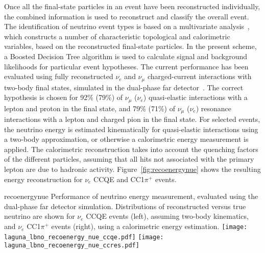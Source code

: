 Once all the final-state particles in an event have been reconstructed individually, 
the combined information is used to reconstruct and classify the overall event.
The identification of neutrino event types is based on a 
multivariate analysis~\cite{Back:2013cva,WA105_TDR,LAGUNA-LBNO-deliv,LAGUNA-LBNO-EOI},
which constructs a number of characteristic topological and calorimetric variables,
based on the reconstructed final-state particles. In the present scheme,
a Boosted Decision Tree algorithm is used to calculate signal and background likelihoods 
for particular event hypotheses. The current performance has been evaluated using fully reconstructed
$\nu_{e}$ and $\nu_{\mu}$ charged-current interactions with two-body final states,
simulated in the dual-phase far detector~\cite{LAGUNA-LBNO-deliv}. 
The correct hypothesis is chosen for 92\% (79\%) of $\nu_{\mu}$ ($\nu_{e}$) quasi-elastic interactions 
with a lepton and proton in the final state, and 79\% (71\%) of $\nu_{\mu}$ ($\nu_{e}$) 
resonance interactions with a lepton and charged pion in the final state.
For selected events, the neutrino energy is estimated kinematically for quasi-elastic interactions
using a two-body approximation, or otherwise a calorimetric energy measurement is applied.
The calorimetric reconstruction takes into account the quenching factors of the different particles, 
assuming that all hits not associated with the primary lepton are due to hadronic activity.
Figure~\ref{fig:recoenergynue} shows the resulting energy reconstruction for $\nu_e$ CCQE and CC1$\pi^{+}$ events.

\begin{cdrfigure}{recoenergynue}
{Performance of neutrino energy measurement, evaluated using the dual-phase far detector simulation. 
Distributions of reconstructed versus true neutrino are shown for $\nu_{e}$ CCQE events (left),
assuming two-body kinematics, and $\nu_{e}$  CC1$\pi^{+}$ events (right),
using a calorimetric energy estimation.}
\texttt{[image: laguna\_lbno\_recoenergy\_nue\_ccqe.pdf]}
\texttt{[image: laguna\_lbno\_recoenergy\_nue\_ccres.pdf]}
\end{cdrfigure}


